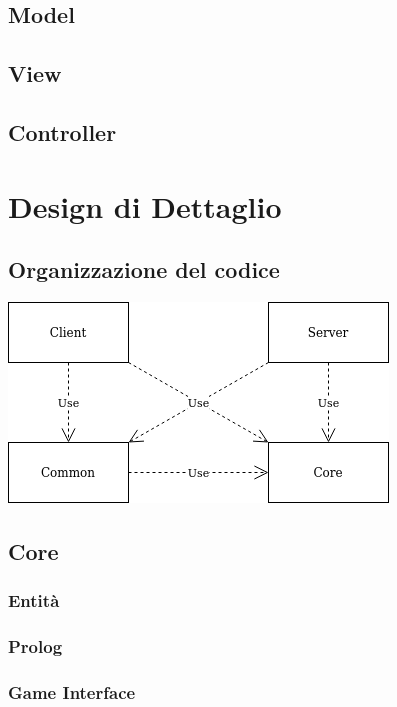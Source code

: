 \documentclass[a4paper,10pt]{article}
\begin{document}
    \subsection{Model}

    \subsection{View}

    \subsection{Controller}

    \newpage


    \section{Design di Dettaglio}

    \subsection{Organizzazione del codice}
    \begin{center}
        \includegraphics[scale=0.5]{moduli.png}
    \end{center}

    \subsection{Core}

    \subsubsection{Entità}

    \subsubsection{Prolog}

    \subsubsection{Game Interface}
\end{document}

